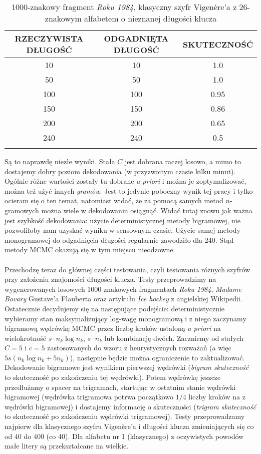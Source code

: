 \documentclass[a4paper]{article}
\theoremstyle{defn}
\theoremstyle{theorem}
\theoremstyle{lemma}
\theoremstyle{cor}
\theoremstyle{fact}
\begin{document}
\begin{center}\begin{longtable}{|c|c|c|}
\hline RZECZYWISTA DŁUGOŚĆ & ODGADNIĘTA DŁUGOŚĆ & SKUTECZNOŚĆ\\ \hline
10 & 10 & 1.0\\ \hline
50 & 50 & 1.0\\ \hline
100 & 100 & 0.95\\ \hline
150 & 150 & 0.86\\ \hline
200 & 200 & 0.65\\ \hline
240 & 240 & 0.5\\ \hline
\caption{1000-znakowy fragment \textit{Roku 1984}, klasyczny szyfr Vigenère'a z 26-znakowym alfabetem o nieznanej długości klucza}
\end{longtable}\end{center}
Są to naprawdę niezłe wyniki. Stała $C$ jest dobrana raczej losowo, a mimo to dostajemy dobry poziom dekodowania (w przyzwoitym czasie kilku minut). Ogólnie różne wartości zostały tu dobrane \textit{a priori} i można je zoptymalizować, można też użyć innych \textit{gramów}. Jest to jedynie poboczny wynik tej pracy i tylko ocieram się o ten temat, natomiast widać, że za pomocą samych metod $n$-gramowych można wiele w dekodowaniu osiągnąć. Widać tutaj znowu jak ważna jest szybkość dekodowania: użycie deterministycznej metody bigramowej, nie pozwoliłoby nam uzyskać wyniku w sensownym czasie. Użycie samej metody monogramowej do odgadnięcia długości regularnie zawodziło dla 240. Stąd metody MCMC okazują się w tym miejscu nieodzowne.
\\\\
Przechodzę teraz do głównej części testowania, czyli testowania różnych szyfrów przy założeniu znajomości długości klucza.
 Testy przeprowadzimy na wygenerowanych losowych 1000-znakowych fragmentach \textit{Roku 1984}, \textit{Madame Bovary}  Gustave'a Flauberta \cite{gutenberg} oraz artykułu \textit{Ice hockey} \cite{hockey} z angielskiej Wikipedii.
Ostatecznie decydujemy się na następujące podejście: deterministycznie wybieramy stan maksymalizujący log-wagę monogramową i z niego zaczynamy bigramową wędrówkę MCMC przez liczbę kroków ustaloną \textit{a priori} na wielokrotność $s \cdot n_k \log n_k$, $s \cdot n_k$ lub kombinację dwóch. Zaczniemy od stałych $C=5$  i $c=5$ zastosowanych do wzoru z heurystycznych rozważań (a więc $5s(n_k\log n_k + 5n_k)$), następnie będzie można ograniczenie to zaktualizować. Dekodowanie bigramowe jest wynikiem pierwszej wędrówki (\textit{bigram skuteczność} to skuteczność po zakończeniu tej wędrówki). Potem wędrówkę jeszcze przedłużamy o spacer na trigramach, startując w ostatnim stanie wędrówki bigramowej (wędrówka trigramowa potrwa początkowo $1/4$ liczby kroków na z wędrówki bigramowej) i dostajemy informację o skuteczności (\textit{trigram skuteczność} to skuteczność po zakończeniu wędrówki trigramowej). Testy przeprowadzamy najpierw dla klasycznego szyfru Vigenère'a i długości klucza zmieniających się co od 40 do 400 (co 40). Dla alfabetu nr 1 (klasycznego) z oczywistych powodów małe litery są przekształcane na wielkie.\\
\end{document}
